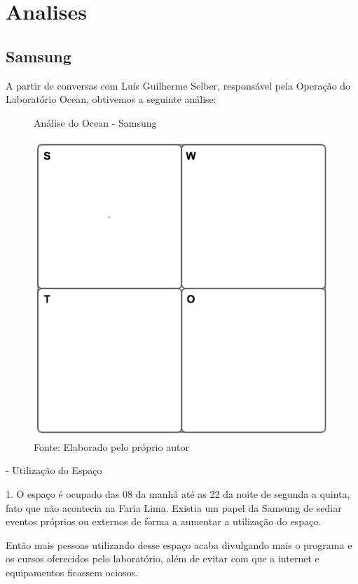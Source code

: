 \chapter{Analises}
\label{cha:analises}

\section{Samsung}

A partir de conversas com Luís Guilherme Selber, responsável pela Operação do Laboratório Ocean, obtivemos a seguinte análise:

\begin{figure}[h]
\caption{Análise do Ocean - Samsung}
\centerline{\includegraphics[scale=0.5]{img/generalswot}}
\label{fig:swotsamsung}
\caption* {Fonte: Elaborado pelo próprio autor}
\end{figure}

- Utilização do Espaço

1. O espaço é ocupado das 08 da manhã até as 22 da noite de segunda a quinta, fato que não acontecia na Faria Lima. Existia um papel da Samsung de sediar eventos próprios ou externos de forma a aumentar a utilização do espaço. 

Então mais pessoas utilizando desse espaço acaba divulgando mais o programa e os cursos oferecidos pelo laboratório, além de evitar com que a internet e equipamentos ficassem ociosos.

